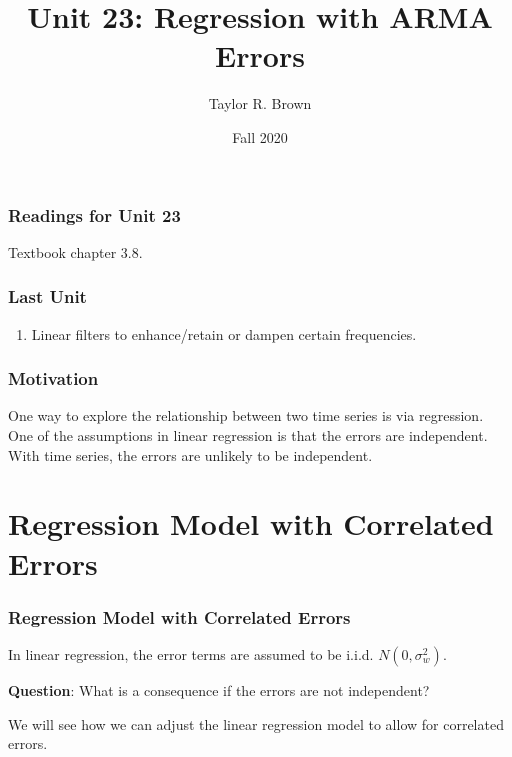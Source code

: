 \documentclass[%
xcolor=pdftex]{beamer}
\title{Unit 23: Regression with ARMA Errors}
\author[STAT 5170: Applied Time Series, Unit 25]{Taylor R. Brown}
\institute{Department of Statistics, University of Virginia}
\date{Fall 2020}
\begin{document}
\frame{\titlepage}


\begin{frame}
\frametitle{Readings for Unit 23}

Textbook chapter 3.8.

\end{frame}


\begin{frame}
\frametitle{Last Unit}
\begin{enumerate}
\item Linear filters to enhance/retain or dampen certain frequencies.
\end{enumerate}
\end{frame}

\begin{frame}
\frametitle{Motivation}

One way to explore the relationship between two time series is via regression. One of the assumptions in linear regression is that the errors are independent. With time series, the errors are unlikely to be independent.


\end{frame}

\section{Regression Model with Correlated Errors}
\frame{\tableofcontents[currentsection]}

\begin{frame}
\frametitle{Regression Model with Correlated Errors}

In linear regression, the error terms are assumed to be i.i.d. $N(0, \sigma_w^2)$.

\vspace{10mm}

\textbf{Question}: What is a consequence if the errors are not independent?

\vspace{10mm}

We will see how we can adjust the linear regression model to allow for correlated errors.

\end{frame}
\end{document}
